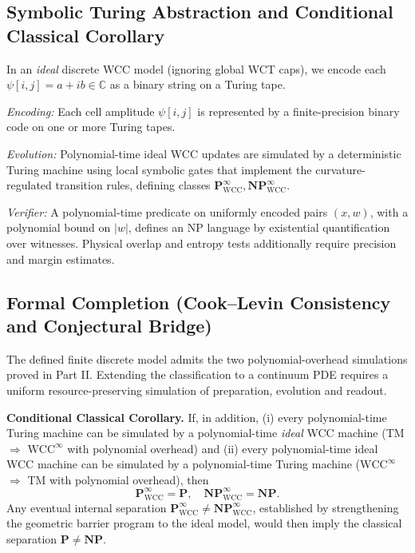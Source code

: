 \documentclass[12pt]{article}
\theoremstyle{remark}
\begin{document}
\subsection{Symbolic Turing Abstraction and Conditional Classical Corollary}

In an \emph{ideal} discrete WCC model (ignoring global WCT caps), we encode
each \( \psi[i,j] = a + ib \in \mathbb{C} \) as
a binary string on a Turing tape.

\textit{Encoding:} Each cell amplitude \( \psi[i,j] \) is represented by a
finite-precision binary code on one or more Turing tapes.

\textit{Evolution:} Polynomial-time ideal WCC updates are simulated by a
deterministic Turing machine using local symbolic gates that implement the
curvature-regulated transition rules, defining classes
$\mathbf{P}_{\mathrm{WCC}}^{\infty}, \mathbf{NP}_{\mathrm{WCC}}^{\infty}$.

\textit{Verifier:} A polynomial-time predicate on uniformly encoded pairs
$(x,w)$, with a polynomial bound on $|w|$, defines an NP language by
existential quantification over witnesses. Physical overlap and entropy
tests additionally require precision and margin estimates.

\subsection{Formal Completion (Cook--Levin Consistency and Conjectural Bridge)}

The defined finite discrete model admits the two polynomial-overhead
simulations proved in Part II. Extending the classification to a continuum
PDE requires a uniform resource-preserving simulation of preparation,
evolution and readout.

\noindent
\textbf{Conditional Classical Corollary.}
If, in addition, (i) every polynomial-time Turing machine can be simulated
by a polynomial-time \emph{ideal} WCC machine (TM $\Rightarrow$
$\mathrm{WCC}^{\infty}$ with polynomial overhead) and (ii) every
polynomial-time ideal WCC machine can be simulated by a polynomial-time
Turing machine ($\mathrm{WCC}^{\infty}$ $\Rightarrow$ TM with polynomial
overhead), then
\[
\mathbf{P}_{\mathrm{WCC}}^{\infty} = \mathbf{P}, \quad
\mathbf{NP}_{\mathrm{WCC}}^{\infty} = \mathbf{NP}.
\]
Any eventual internal separation
$\mathbf{P}_{\mathrm{WCC}}^{\infty} \neq
 \mathbf{NP}_{\mathrm{WCC}}^{\infty}$,
established by strengthening the geometric barrier program to the ideal
model, would then imply the classical separation $\mathbf{P} \neq \mathbf{NP}$.
\end{document}
